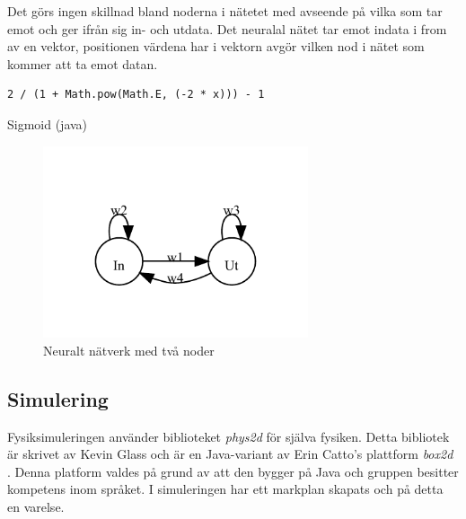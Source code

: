 \documentclass[titlepage, twocolumn, a4paper, 12pt]{article}
\begin{document}
Det görs ingen skillnad bland noderna i nätetet med avseende på vilka som tar emot och ger ifrån sig in- och utdata. Det neuralal nätet tar emot indata i from av en vektor, positionen värdena har i vektorn avgör vilken nod i nätet som kommer att ta emot datan.

\begin{kod}
\begin{footnotesize}
\begin{verbatim}
2 / (1 + Math.pow(Math.E, (-2 * x))) - 1
\end{verbatim}
\end{footnotesize}
\caption{Sigmoid (java)}\label{kod:sigmoid}
\end{kod}

\begin{figure}[H]
  \begin{center}
    \includegraphics[width=78mm]{images/neuralnet.pdf}
    \caption{Neuralt nätverk med två noder}
    \label{fig:neuralnet.pdf}
  \end{center}
\end{figure}


\subsection{Simulering}
Fysiksimuleringen använder biblioteket \textit{phys2d} \cite{phys2d} för själva fysiken. Detta bibliotek är skrivet av Kevin Glass och är en Java-variant av Erin Catto's plattform \textit{box2d} \cite{box2d}. Denna platform valdes på grund av att den bygger på Java och gruppen besitter kompetens inom språket. I simuleringen har ett markplan skapats och på detta en varelse. 
\end{document}
